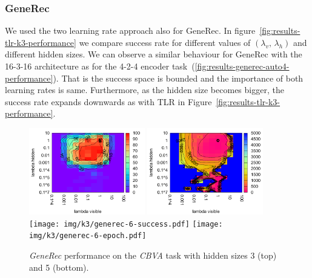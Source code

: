 

\subsubsection{GeneRec} 

We used the two learning rate approach also for GeneRec. In figure~\ref{fig:results-tlr-k3-performance} we compare success rate for different values of $(\lambda_v,\, \lambda_h)$ and different hidden sizes. We can observe a similar behaviour for GeneRec with the 16-3-16 architecture as for the 4-2-4 encoder task~(\ref{fig:results-generec-auto4-performance}). That is the success space is bounded and the importance of both learning rates is same. Furthermore, as the hidden size becomes bigger, the success rate expands downwards as with TLR in Figure~\ref{fig:results-tlr-k3-performance}. 

\begin{figure}[H]
  \centering
  \includegraphics[width=0.45\textwidth]{img/k3/generec-3-success.pdf} 
  \includegraphics[width=0.45\textwidth]{img/k3/generec-3-epoch.pdf}   
  \texttt{[image: img/k3/generec-6-success.pdf]} 
  \texttt{[image: img/k3/generec-6-epoch.pdf]}  
  \caption{\emph{GeneRec} performance on the \emph{CBVA} task with hidden sizes 3 (top) and 5 (bottom).} %
  \label{fig:results-generec-k3-success}
\end{figure}

